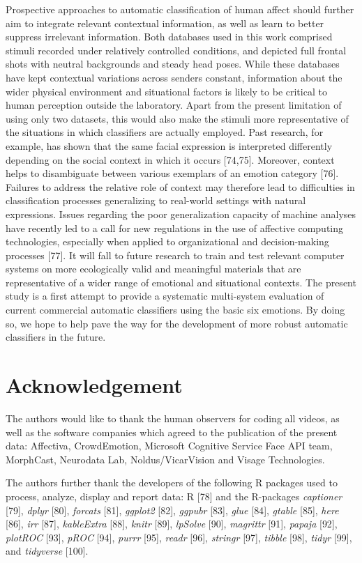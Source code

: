 \documentclass[10pt,letterpaper]{article}
\begin{document}
Prospective approaches to automatic classification of human affect should further aim to integrate relevant contextual information, as well as learn to better suppress irrelevant information. Both databases used in this work comprised stimuli recorded under relatively controlled conditions, and depicted full frontal shots with neutral backgrounds and steady head poses. While these databases have kept contextual variations across senders constant, information about the wider physical environment and situational factors is likely to be critical to human perception outside the laboratory. Apart from the present limitation of using only two datasets, this would also make the stimuli more representative of the situations in which classifiers are actually employed. Past research, for example, has shown that the same facial expression is interpreted differently depending on the social context in which it occurs {[}74,75{]}. Moreover, context helps to disambiguate between various exemplars of an emotion category {[}76{]}. Failures to address the relative role of context may therefore lead to difficulties in classification processes generalizing to real-world settings with natural expressions. Issues regarding the poor generalization capacity of machine analyses have recently led to a call for new regulations in the use of affective computing technologies, especially when applied to organizational and decision-making processes {[}77{]}. It will fall to future research to train and test relevant computer systems on more ecologically valid and meaningful materials that are representative of a wider range of emotional and situational contexts. The present study is a first attempt to provide a systematic multi-system evaluation of current commercial automatic classifiers using the basic six emotions. By doing so, we hope to help pave the way for the development of more robust automatic classifiers in the future.

\hypertarget{acknowledgement}{%
\section{Acknowledgement}\label{acknowledgement}}

The authors would like to thank the human observers for coding all videos, as well as the software companies which agreed to the publication of the present data: Affectiva, CrowdEmotion, Microsoft Cognitive Service Face API team, MorphCast, Neurodata Lab, Noldus/VicarVision and Visage Technologies.

The authors further thank the developers of the following R packages used to process, analyze, display and report data: R {[}78{]} and the R-packages \emph{captioner} {[}79{]}, \emph{dplyr} {[}80{]}, \emph{forcats} {[}81{]}, \emph{ggplot2} {[}82{]}, \emph{ggpubr} {[}83{]}, \emph{glue} {[}84{]}, \emph{gtable} {[}85{]}, \emph{here} {[}86{]}, \emph{irr} {[}87{]}, \emph{kableExtra} {[}88{]}, \emph{knitr} {[}89{]}, \emph{lpSolve} {[}90{]}, \emph{magrittr} {[}91{]}, \emph{papaja} {[}92{]}, \emph{plotROC} {[}93{]}, \emph{pROC} {[}94{]}, \emph{purrr} {[}95{]}, \emph{readr} {[}96{]}, \emph{stringr} {[}97{]}, \emph{tibble} {[}98{]}, \emph{tidyr} {[}99{]}, and \emph{tidyverse} {[}100{]}.
\end{document}
